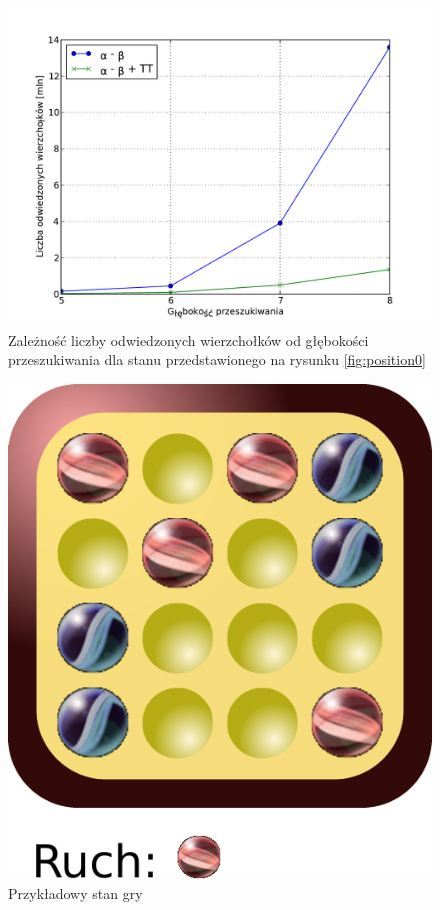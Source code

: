 \documentclass{scrartcl}
\begin{document}
\begin{figure}[h]
  \centering
  \includegraphics[scale=0.5]{data/results0.pdf}
  \caption{Zależność liczby odwiedzonych wierzchołków od głębokości
    przeszukiwania dla stanu przedstawionego na rysunku
    \ref{fig:position0}}
  \label{fig:results0}
\end{figure}


\begin{figure}[h]
  \centering
  \includegraphics[scale=0.6]{data/position1.pdf}
  \caption{Przykładowy stan gry}
  \label{fig:position1}
\end{figure}
\end{document}
